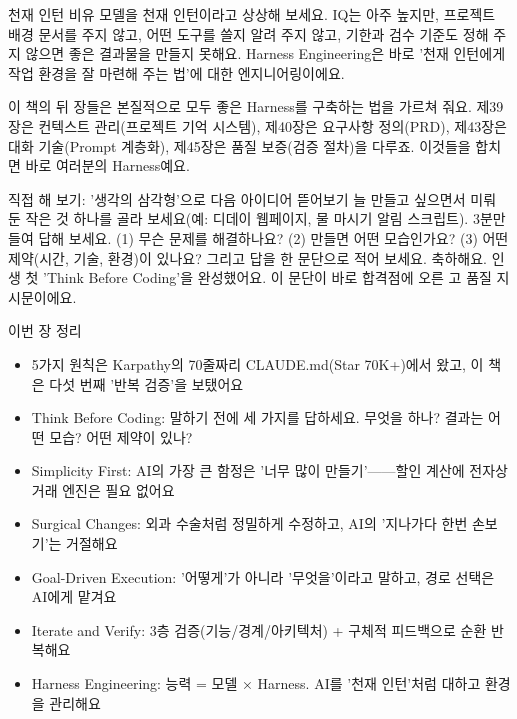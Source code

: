 \begin{tcbinfo}{천재 인턴 비유}
모델을 천재 인턴이라고 상상해 보세요. IQ는 아주 높지만, 프로젝트 배경 문서를 주지 않고, 어떤 도구를 쓸지 알려 주지 않고, 기한과 검수 기준도 정해 주지 않으면 좋은 결과물을 만들지 못해요. Harness Engineering은 바로 '천재 인턴에게 작업 환경을 잘 마련해 주는 법'에 대한 엔지니어링이에요.

\end{tcbinfo}

이 책의 뒤 장들은 본질적으로 모두 좋은 Harness를 구축하는 법을 가르쳐 줘요. 제39장은 컨텍스트 관리(프로젝트 기억 시스템), 제40장은 요구사항 정의(PRD), 제43장은 대화 기술(Prompt 계층화), 제45장은 품질 보증(검증 절차)을 다루죠. 이것들을 합치면 바로 여러분의 Harness예요.

\begin{tcbpractice}{직접 해 보기: '생각의 삼각형'으로 다음 아이디어 뜯어보기}
늘 만들고 싶으면서 미뤄 둔 작은 것 하나를 골라 보세요(예: 디데이 웹페이지, 물 마시기 알림 스크립트). 3분만 들여 답해 보세요. (1) 무슨 문제를 해결하나요? (2) 만들면 어떤 모습인가요? (3) 어떤 제약(시간, 기술, 환경)이 있나요? 그리고 답을 한 문단으로 적어 보세요. 축하해요. 인생 첫 'Think Before Coding'을 완성했어요. 이 문단이 바로 합격점에 오른 고 품질 지시문이에요.

\end{tcbpractice}

\begin{tcbsummary}{이번 장 정리}
\begin{itemize}
  \item 5가지 원칙은 Karpathy의 70줄짜리 CLAUDE.md(Star 70K+)에서 왔고, 이 책은 다섯 번째 '반복 검증'을 보탰어요
  \item Think Before Coding: 말하기 전에 세 가지를 답하세요. 무엇을 하나? 결과는 어떤 모습? 어떤 제약이 있나?
  \item Simplicity First: AI의 가장 큰 함정은 '너무 많이 만들기'——할인 계산에 전자상거래 엔진은 필요 없어요
  \item Surgical Changes: 외과 수술처럼 정밀하게 수정하고, AI의 '지나가다 한번 손보기'는 거절해요
  \item Goal-Driven Execution: '어떻게'가 아니라 '무엇을'이라고 말하고, 경로 선택은 AI에게 맡겨요
  \item Iterate and Verify: 3층 검증(기능/경계/아키텍처) + 구체적 피드백으로 순환 반복해요
  \item Harness Engineering: 능력 = 모델 × Harness. AI를 '천재 인턴'처럼 대하고 환경을 관리해요
\end{itemize}

\end{tcbsummary}
